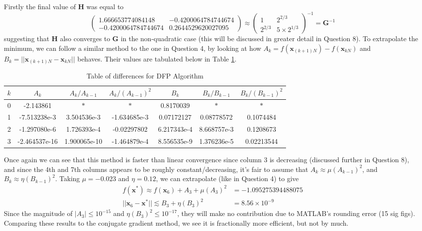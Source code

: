 \documentclass[10pt,a4paper,notitlepage]{article}
\newcommand{\abs}[1]{\lvert#1\rvert}
\newcommand{\x}{\mathbf{x}}
\newcommand{\h}{\mathbf{H}}
\newcommand{\G}{\mathbf{G}}
\begin{document}
Firstly the final value of $\h$ was equal to 
\begin{equation}
\begin{pmatrix} 1.666653774084148 & -0.4200064784744674\\ -0.4200064784744674 & 0.2644529620027095 \end{pmatrix}\approx \begin{pmatrix} 1 & 2^{2/3} \\ 2^{2/3} & 5\times 2^{1/3}\end{pmatrix}^{-1}=\G^{-1}
\end{equation}
suggesting that $\h$ also converges to $\G$ in the non-quadratic case (this will be discussed in greater detail in Question 8). To extrapolate the minimum, we can follow a similar method to the one in Question 4, by looking at how $A_{k}=f(\x_{(k+1)N})-f(\x_{kN})$ and $B_{k}=\abs{\abs{\x_{(k+1)N}-\x_{kN}}}$ behaves. Their values are tabulated below in Table \ref{tb:11}.
\begin{table}[H]
\centering
\begin{tabular}{|c|ccc|ccc|} \hline $k$ & $A_{k}$ & $A_{k}/A_{k-1}$ & $A_{k}/\left(A_{k-1}\right)^{2}$ & $B_{k}$ & $B_{k}/B_{k-1}$ & $B_{k}/\left(B_{k-1}\right)^{2}$ \\ \hline 0 & -2.143861 & $\ast$ & $\ast$ & 0.8170039 & $\ast$ & $\ast$\\ 
1 & -7.513238e-3 & 3.504536e-3 & -1.634685e-3 & 0.07172127 & 0.08778572 & 0.1074484\\ 
2 & -1.297080e-6 & 1.726393e-4 & -0.02297802 & 6.217343e-4 & 8.668757e-3 & 0.1208673\\ 
3 & -2.464537e-16 & 1.900065e-10 & -1.464879e-4 & 8.556535e-9 & 1.376236e-5 & 0.02213544\\ \hline
\end{tabular}
\caption{Table of differences for DFP Algorithm}\label{tb:11}
\end{table}
Once again we can see that this method is faster than linear convergence since column 3 is decreasing (discussed further in Question 8), and since the 4th and 7th columns appears to be roughly constant/decreasing, it's fair to assume that $A_{k}\approx \mu (A_{k-1})^{2}$, and $B_{k}\approx \eta (B_{k-1})^{2}$. Taking $\mu=-0.023$ and $\eta=0.12$, we can extrapolate (like in Question 4) to give 
\begin{equation}
\begin{aligned}
f(\x^{*}) \approx f(\x_{6})+A_{3}+\mu (A_{3})^{2} &=-1.095275394488075\\
\abs{\abs{\x_{6}-\x^{*}}} \lesssim B_{3}+\eta (B_{3})^{2} &= 8.56\times 10^{-9}
\end{aligned}
\end{equation}
Since the magnitude of $\abs{A_{3}}\leq 10^{-15}$ and $\eta (B_{3})^{2}\leq 10^{-17}$, they will make no contribution due to MATLAB's rounding error (15 sig figs). Comparing these results to the conjugate gradient method, we see it is fractionally more efficient, but not by much.
\end{document}
